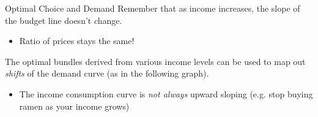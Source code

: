 \documentclass[12pt,t]{beamer}
\begin{document}
\begin{frame}{Optimal Choice and Demand}
  Remember that as income increases, the slope of the budget line doesn't change. 

  \begin{itemize}
    \item Ratio of prices stays the same!
  \end{itemize}
  \bigskip\pause
  The optimal bundles derived from various income levels can be used to map out \textit{shifts} of the demand curve (as in the following graph).
  
  \begin{itemize}
    \item The income consumption curve is \textit{not always} upward sloping (e.g. stop buying ramen as your income grows)
  \end{itemize}
\end{frame}
\end{document}
